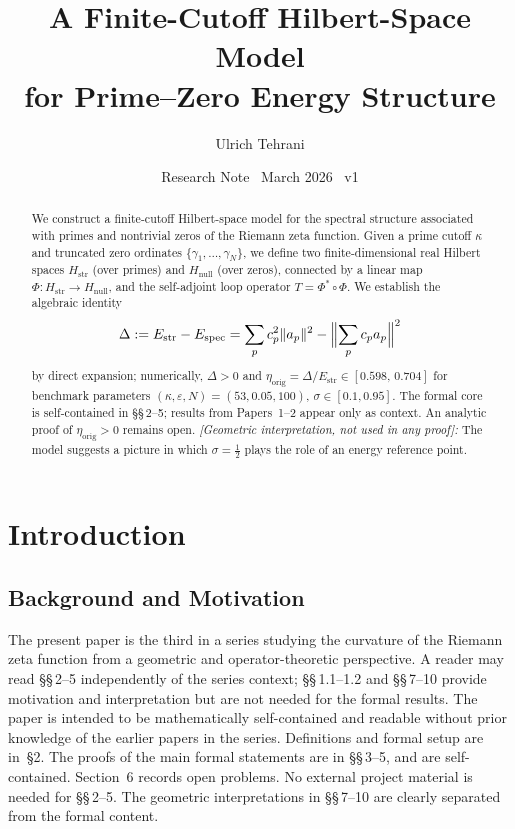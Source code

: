 \documentclass[11pt]{article}
\title{\vspace{-1.5em}\bfseries A Finite-Cutoff Hilbert-Space Model\\[0.4em]
\large for Prime--Zero Energy Structure}
\author{Ulrich Tehrani}
\date{Research Note \textperiodcentered\ March 2026 \textperiodcentered\ v1}
\newcommand{\Hstr}{H_{\mathrm{str}}}
\newcommand{\Hnull}{H_{\mathrm{null}}}
\newcommand{\Estr}{E_{\mathrm{str}}}
\newcommand{\Espec}{E_{\mathrm{spec}}}
\newcommand{\etaorig}{\eta_{\mathrm{orig}}}
\begin{document}
\maketitle

\begin{abstract}
We construct a finite-cutoff Hilbert-space model for the spectral structure
associated with primes and nontrivial zeros of the Riemann zeta function.
Given a prime cutoff $\kappa$ and truncated zero ordinates
$\{\gamma_1,\ldots,\gamma_N\}$, we define two finite-dimensional real
Hilbert spaces $\Hstr$ (over primes) and $\Hnull$ (over zeros),
connected by a linear map $\Phi\colon\Hstr\to\Hnull$, and the
self-adjoint loop operator $T = \Phi^*\circ\Phi$.
We establish the algebraic identity
\[
\Delta := \Estr - \Espec
 = \sum_p c_p^2\|a_p\|^2 - \Bigl\|\sum_p c_p a_p\Bigr\|^2
\]
by direct expansion; numerically, $\Delta > 0$ and
$\etaorig = \Delta/\Estr \in [0.598,\,0.704]$ for benchmark parameters
$(\kappa,\varepsilon,N)=(53,0.05,100)$, $\sigma\in[0.1,0.95]$.
The formal core is self-contained in \S\S\,2--5;
results from Papers~1--2 appear only as context.
An analytic proof of $\etaorig>0$ remains open.
\emph{[Geometric interpretation, not used in any proof]:}
The model suggests a picture in which $\sigma=\tfrac12$ plays
the role of an energy reference point.
\end{abstract}

\tableofcontents
\newpage

\section{Introduction}

\subsection{Background and Motivation}

The present paper is the third in a series studying the curvature of the
Riemann zeta function from a geometric and operator-theoretic perspective.
A reader may read \S\S\,2--5 independently of the series context;
\S\S\,1.1--1.2 and \S\S\,7--10 provide motivation and interpretation
but are not needed for the formal results.
The paper is intended to be mathematically self-contained and readable
without prior knowledge of the earlier papers in the series.
Definitions and formal setup are in~\S2.
The proofs of the main formal statements are in \S\S\,3--5, and are
self-contained. Section~6 records open problems.
No external project material is needed for \S\S\,2--5.
The geometric interpretations in \S\S\,7--10 are clearly separated from
the formal content.
\end{document}
